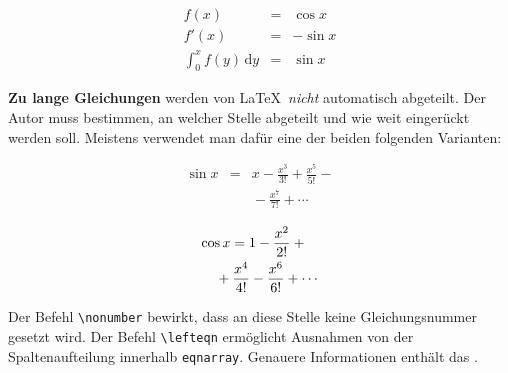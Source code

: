 \begin{LTXexample}
\begin{eqnarray}
f(x) & = & \cos x       \\
f'(x) & = & -\sin x     \\
\int_{0}^{x} f(y)\,\mathrm{d}y &
 = & \sin x
\end{eqnarray}
\end{LTXexample}

 
\textbf{Zu lange Gleichungen} werden von \LaTeX\ \textit{nicht}
automatisch abgeteilt.
Der Autor muss bestimmen, an welcher Stelle abgeteilt und wie
weit eingerückt werden soll.
Meistens verwendet man dafür eine der beiden folgenden
Varianten:

\begin{LTXexample}
\begin{eqnarray}
\sin x & = & x -\frac{x^{3}}{3!}
     +\frac{x^{5}}{5!} - {} 
                    \nonumber\\
 & &{} -\frac{x^{7}}{7!} + \cdots
\end{eqnarray}
\end{LTXexample}


\begin{LTXexample}
\begin{eqnarray}
\lefteqn{ \cos x = 1
     -\frac{x^{2}}{2!} +{} }
                    \nonumber\\
 & &{} +\frac{x^{4}}{4!}
     -\frac{x^{6}}{6!} + \cdots
\end{eqnarray}
\end{LTXexample}

Der Befehl \lstinline|\nonumber| bewirkt, dass an diese Stelle keine
Gleichungsnummer gesetzt wird.
Der Befehl \lstinline|\lefteqn| ermöglicht Ausnahmen von der
Spaltenaufteilung innerhalb \texttt{eqnarray}. 
Genauere Informationen enthält das \manual.

\endinput
